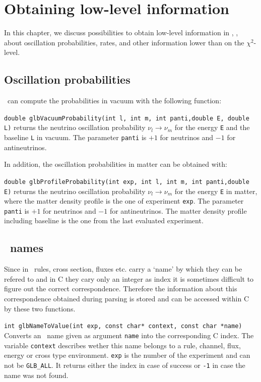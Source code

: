 \chapter{Obtaining low-level information}

In this chapter, we discuss possibilities to obtain low-level information
in \GLOBES , \ie, about oscillation probabilities, rates, and other
information lower than on the $\chi^2$-level.

\section{Oscillation probabilities}

\GLOBES\ can compute the probabilities in vacuum
with the following function:
\begin{function}
{\tt double glbVacuumProbability(int l, int m, int panti,double E, double L)} returns the neutrino oscillation probability $\nu_l \rightarrow \nu_m$ for the energy {\tt E} and the baseline {\tt L} in vacuum. The parameter
{\tt panti} is $+1$ for neutrinos and $-1$ for antineutrinos. 
\end{function}
In addition, the oscillation probabilities in matter can be obtained
with:
\begin{function}
{\tt double glbProfileProbability(int exp, int l, int m, int panti,double E)} returns the neutrino oscillation probability $\nu_l \rightarrow \nu_m$ for the energy {\tt E} in matter, where the matter density profile
is the one of experiment {\tt exp}. The parameter
{\tt panti} is $+1$ for neutrinos and $-1$ for antineutrinos.
The matter density profile including baseline is the one from the last
evaluated experiment. 
\end{function}
\section{\AEDL\ names}
\label{sec:aedl_names}

Since in \AEDL\ rules, cross section, fluxes etc. carry a `name' by
which they can be refered to and in C they cary only an integer as
index it is sometimes difficult to figure out the correct correspondence.
Therefore the information about this correspondence obtained during
parsing is stored and can be accessed within C by these two functions.
\begin{function}
{\tt int glbNameToValue(int exp, const char* context, const char *name)}
Converts an \AEDL\ name given as argument {\tt name} into the corresponding
C index. The variable {\tt context} describes wether this name belongs
to a rule, channel, flux, energy or cross type environment. {\tt exp}
is the number of the experiment and can not be {\tt GLB\_ALL}. It returns
either the index in case of success or {\tt -1} in case the name was not
found. 
\end{function}


